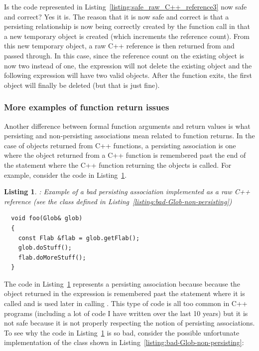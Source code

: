\documentclass[pdf,ps2pdf,11pt]{SANDreport}
\newtheorem{listing}{Listing}
\begin{document}
Is the code represented in
Listing~\ref{listing:safe_raw_C++_reference3} now safe and correct?
Yes it is.  The reason that it is now safe and correct is that a
persisting relationship is now being correctly created by the function
call {} in that a new temporary {}
object is created (which increments the reference count).  From this
new temporary {} object, a raw C++ reference is then
returned from {} and passed through.  In this
case, since the reference count on the existing {} object is
now two instead of one, the expression {}
will not delete the existing {} object and the following
expression {} will have two valid
{} objects.  After the function
{} exits, the first
{} object will finally be deleted (but that is just fine).


%
{}\subsubsection*{More examples of function return issues}
%

Another difference between formal function arguments and return values
is what persisting and non-persisting associations mean related to
function returns.  In the case of objects returned from C++ functions,
a persisting association is one where the object returned from a C++
function is remembered past the end of the statement where the C++
function returning the objects is called.  For example, consider the
code in Listing~\ref{listing:persisting-func-return-1}.


{}\begin{listing}: Example of a bad persisting association
implemented as a raw C++ reference (see the {} class
defined in Listing~\ref{listing:bad-Glob-non-persisting})
\label{listing:persisting-func-return-1}
{\small\begin{verbatim}
  void foo(Glob& glob)
  {
    const Flab &flab = glob.getFlab();
    glob.doStuff();
    flab.doMoreStuff();
  }
\end{verbatim}}
\end{listing}


The code in Listing~\ref{listing:persisting-func-return-1} represents
a persisting association because because the {} object
returned in the expression {} is remembered past the statement where it is
called and is used later in calling {}.  This
type of code is all too common in C++ programs (including a lot of
code I have written over the last 10 years) but it is not safe because
it is not properly respecting the notion of persisting associations.
To see why the code in Listing~\ref{listing:persisting-func-return-1} is so bad, consider the
possible unfortunate implementation of the {} class shown in
Listing~\ref{listing:bad-Glob-non-persisting}:
\end{document}
